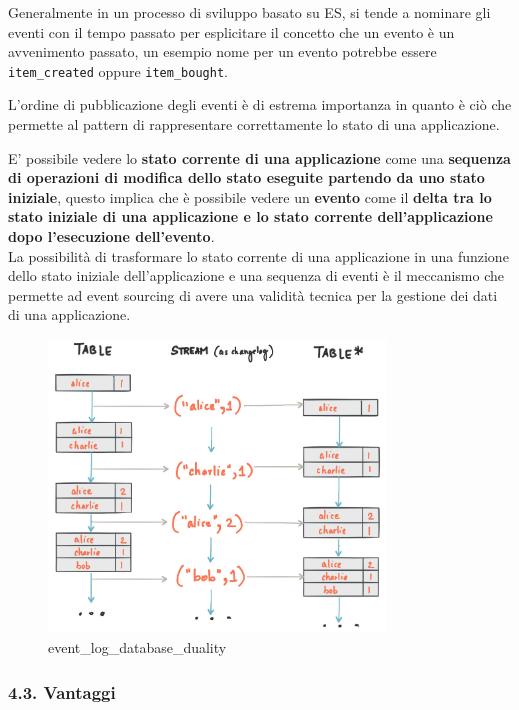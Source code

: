 \documentclass[]{article}
\begin{document}
Generalmente in un processo di sviluppo basato su ES, si tende a
nominare gli eventi con il tempo passato per esplicitare il concetto che
un evento è un avvenimento passato, un esempio nome per un evento
potrebbe essere \texttt{item\_created} oppure \texttt{item\_bought}.

L'ordine di pubblicazione degli eventi è di estrema importanza in quanto
è ciò che permette al pattern di rappresentare correttamente lo stato di
una applicazione.

E' possibile vedere lo \textbf{stato corrente di una applicazione} come
una \textbf{sequenza di operazioni di modifica dello stato eseguite
partendo da uno stato iniziale}, questo implica che è possibile vedere
un \textbf{evento} come il \textbf{delta tra lo stato iniziale di una
applicazione e lo stato corrente dell'applicazione dopo l'esecuzione
dell'evento}.\\
La possibilità di trasformare lo stato corrente di una applicazione in
una funzione dello stato iniziale dell'applicazione e una sequenza di
eventi è il meccanismo che permette ad event sourcing di avere una
validità tecnica per la gestione dei dati di una applicazione.

\begin{figure}
\centering
\includegraphics[width=0.80000\textwidth]{../images/streams-table-duality.jpg}
\caption{event\_log\_database\_duality \label{figure_2}}
\end{figure}

\newpage

\subsubsection{4.3. Vantaggi}\label{vantaggi}
\end{document}
